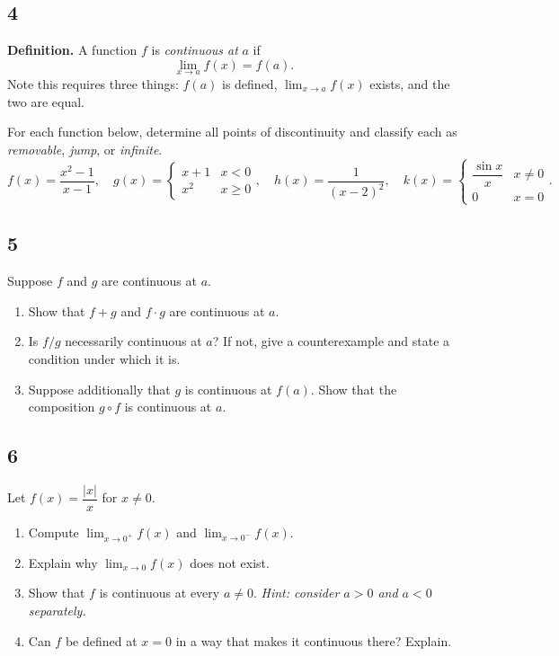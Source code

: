\documentclass[11pt,oneside,reqno]{amsbook}
\numberwithin{equation}{section}
\theoremstyle{definition}
\theoremstyle{remark}
\begin{document}
\subsection*{4} \textbf{Definition.} A function $f$ is \textit{continuous at} $a$ if
\[
\lim_{x \to a} f(x) = f(a).
\]
Note this requires three things: $f(a)$ is defined, $\lim_{x\to a}f(x)$ exists, and the two are equal.

For each function below, determine all points of discontinuity and classify each as \textit{removable}, \textit{jump}, or \textit{infinite}.
\[
f(x) = \frac{x^2-1}{x-1}, \quad g(x) = \begin{cases} x+1 & x < 0 \\ x^2 & x \geq 0 \end{cases}, \quad h(x) = \frac{1}{(x-2)^2}, \quad k(x) = \begin{cases} \dfrac{\sin x}{x} & x \neq 0 \\ 0 & x = 0 \end{cases}.
\]

\subsection*{5} Suppose $f$ and $g$ are continuous at $a$.
\begin{enumerate}[label=(\alph*)]
    \item Show that $f + g$ and $f \cdot g$ are continuous at $a$.
    \item Is $f/g$ necessarily continuous at $a$? If not, give a counterexample and state a condition under which it is.
    \item Suppose additionally that $g$ is continuous at $f(a)$. Show that the composition $g \circ f$ is continuous at $a$.
\end{enumerate}

\subsection*{6} Let $f(x) = \dfrac{|x|}{x}$ for $x \neq 0$.
\begin{enumerate}[label=(\alph*)]
    \item Compute $\displaystyle\lim_{x \to 0^+} f(x)$ and $\displaystyle\lim_{x \to 0^-} f(x)$.
    \item Explain why $\displaystyle\lim_{x \to 0} f(x)$ does not exist.
    \item Show that $f$ is continuous at every $a \neq 0$. \textit{Hint: consider $a > 0$ and $a < 0$ separately.}
    \item Can $f$ be defined at $x = 0$ in a way that makes it continuous there? Explain.
\end{enumerate}
\end{document}
